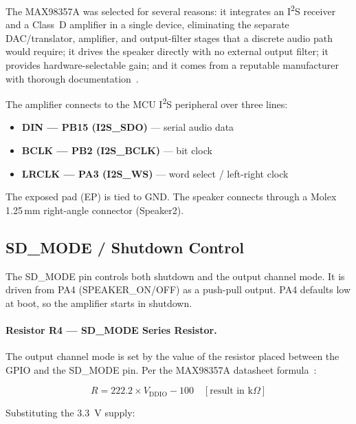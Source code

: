 The MAX98357A was selected for several reasons: it integrates an I\textsuperscript{2}S
receiver and a Class~D amplifier in a single device, eliminating the separate
DAC/translator, amplifier, and output-filter stages that a discrete audio path would
require; it drives the speaker directly with no external output filter; it provides
hardware-selectable gain; and it comes from a reputable manufacturer with thorough
documentation~\cite{ref6}.

The amplifier connects to the MCU I\textsuperscript{2}S peripheral over three lines:

\begin{itemize}
  \item \textbf{DIN --- PB15 (I2S\_SDO)} --- serial audio data
  \item \textbf{BCLK --- PB2 (I2S\_BCLK)} --- bit clock
  \item \textbf{LRCLK --- PA3 (I2S\_WS)} --- word select / left-right clock
\end{itemize}

The exposed pad (EP) is tied to GND. The speaker connects through a Molex 1.25\,mm
right-angle connector (Speaker2).

\subsection{SD\_MODE / Shutdown Control}
\label{subsec:sdmode}

The SD\_MODE pin controls both shutdown and the output channel mode. It is driven from
PA4 (SPEAKER\_ON/OFF) as a push-pull output. PA4 defaults low at boot, so the amplifier
starts in shutdown.

\paragraph{Resistor R4 --- SD\_MODE Series Resistor.}
The output channel mode is set by the value of the resistor placed between the GPIO and
the SD\_MODE pin. Per the MAX98357A datasheet formula~\cite{ref6}:

\begin{equation}
  R = 222.2 \times V_\mathrm{DDIO} - 100 \quad [\text{result in k}\Omega]
  \label{eq:sdmode}
\end{equation}

Substituting the \SI{3.3}{\volt} supply:

